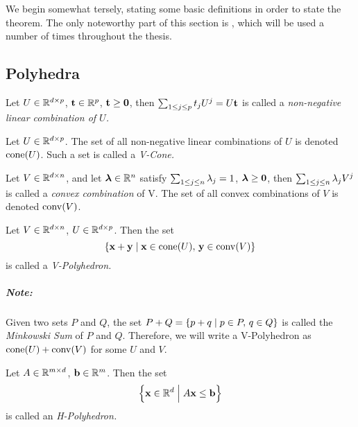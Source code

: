\chapter{\MWT}

We begin somewhat tersely, stating some basic definitions in order to state the theorem.  The only noteworthy part of this section is , which will be used a number of times throughout the thesis.

\section{Polyhedra}

\begin{Def}{
		Let $U \in \mathbb{R}^{d\times p}$, $\mathbf{t} \in \mathbb{R}^{p}$, ${\mathbf{t} \geq \mathbf{0}}$, then \( \sum_{1\leq j \leq p}t_j U^j = U\mathbf{t}\) is called a \em{non-negative linear combination} of $U$.
	}\end{Def}

\begin{Def}[V-Cone]{
		Let $U \in \mathbb{R}^{d\times p}$.  The set of all non-negative linear combinations of $U$ is denoted $\operatorname{cone}(U)$.  Such a set is called a \em{V-Cone}.
	}\end{Def}

\drawVCone

\begin{Def}{
		Let $V \in \mathbb{R}^{d\times n}$, and let $\bm{\lambda} \in \mathbb{R}^{n}$ satisfy $\sum_{1\leq j \leq n}\lambda_j = 1$, $\bm{\lambda} \geq\mathbf{0}$, then \( \sum_{1\leq j \leq n}\lambda_j V^j \) is called a \textit{convex combination} of V.  The set of all convex combinations of $V$ is denoted $\operatorname{conv}(V)$.
	}\end{Def}

\begin{Def}[V-Polyhedron]{
		Let $V \in \mathbb{R}^{d\times n}$, $U \in \mathbb{R}^{d\times p}$.  Then the set
		\[ \left\{\mathbf{x} + \mathbf{y} \;|\; \mathbf{x} \in \operatorname{cone}(U),\, \mathbf{y} \in \operatorname{conv}(V)\right\} \]
		is called a \em{V-Polyhedron}.
	}\end{Def}

\drawVPoly

\paragraph{Note:} Given two sets $P$ and $Q$, the set $P+Q = \left\{p+q\;|\; p\in P,\,q\in Q\right\}$ is called the \textit{Minkowski Sum} of $P$ and $Q$.  Therefore, we will write a V-Polyhedron as $\operatorname{cone}(U) + \operatorname{conv}(V)$ for some $U$ and $V$.\\

\begin{Def}[H-Polyhedron]{
		Let $A \in \mathbb{R}^{{m}\times d}$, $\mathbf{b} \in \mathbb{R}^{m}$.  Then the set
		\[ \left\{\mathbf{x} \in \mathbb{R}^d \;\Big|\; A\mathbf{x} \leq \mathbf{b}\right\} \]
		is called an \em{H-Polyhedron}.
	}\end{Def}

